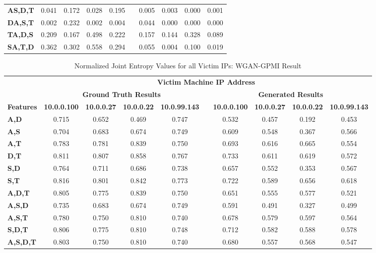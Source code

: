 \begin{table}[!htbp]
\begin{adjustbox}{angle=90}
\begin{tabular}{l|c|c|c|c|c|c|c|c|c|}
			\multicolumn{1}{l|}{\textbf{A{\given}S,D,T}} & 0.041 & 0.172 & 0.028 & 0.195 &  & 0.005	& 0.003	& 0.000	& 0.001 \\
			\multicolumn{1}{l|}{\textbf{D{\given}A,S,T}} & 0.002 & 0.232 & 0.002 & 0.004 &  & 0.044	& 0.000	& 0.000	& 0.000 \\
			\multicolumn{1}{l|}{\textbf{T{\given}A,D,S}} & 0.209 & 0.167 & 0.498 & 0.222 &  & 0.157	& 0.144	& 0.328	& 0.089 \\
			\multicolumn{1}{l|}{\textbf{S{\given}A,T,D}} & 0.362 & 0.302 & 0.558 & 0.294 &  & 0.055	& 0.004	& 0.100	& 0.019
		\end{tabular}
	\end{adjustbox}
\end{table}

\begin{table}[!htbp]
	\caption{Normalized Joint Entropy Values for all Victim IPs: WGAN-GPMI Result}
	\label{tab:je2}
	\centering
	\begin{adjustbox}{angle=90}
		\begin{tabular}{l|c|c|c|c|c|c|c|c|c|}
			\multicolumn{1}{c|}{} & \multicolumn{9}{c|}{\textbf{Victim Machine IP Address}} \\
			\multicolumn{1}{c|}{} & \multicolumn{4}{c|}{\textbf{Ground Truth Results}} &  & \multicolumn{4}{c|}{\textbf{Generated Results}} \\
			\multicolumn{1}{c|}{\textbf{Features}} & \textbf{10.0.0.100} & \textbf{10.0.0.27} & \textbf{10.0.0.22} & \textbf{10.0.99.143} &  & \textbf{10.0.0.100} & \textbf{10.0.0.27} & \textbf{10.0.0.22} & \textbf{10.0.99.143} \\ \hline
			\textbf{A,D} & 0.715 & 0.652 & 0.469 & 0.747 &  & 0.532 & 0.457 & 0.192 & 0.453 \\
			\textbf{A,S} & 0.704 & 0.683 & 0.674 & 0.749 &  & 0.609 & 0.548 & 0.367 & 0.566 \\
			\textbf{A,T} & 0.783 & 0.781 & 0.839 & 0.750 &  & 0.693 & 0.616 & 0.665 & 0.554 \\
			\textbf{D,T} & 0.811 & 0.807 & 0.858 & 0.767 &  & 0.733 & 0.611 & 0.619 & 0.572 \\
			\textbf{S,D} & 0.764 & 0.711 & 0.686 & 0.738 &  & 0.657 & 0.552 & 0.353 & 0.567 \\
			\textbf{S,T} & 0.816 & 0.801 & 0.842 & 0.773 &  & 0.722 & 0.589 & 0.656 & 0.618 \\ \hline
			\textbf{A,D,T} & 0.805 & 0.775 & 0.839 & 0.750 &  & 0.651 & 0.555 & 0.577 & 0.521 \\
			\textbf{A,S,D} & 0.735 & 0.683 & 0.674 & 0.749 &  & 0.591 & 0.491 & 0.327 & 0.499 \\
			\textbf{A,S,T} & 0.780 & 0.750 & 0.810 & 0.740 &  & 0.678 & 0.579 & 0.597 & 0.564 \\
			\textbf{S,D,T} & 0.806 & 0.775 & 0.810 & 0.748 &  & 0.712 & 0.582 & 0.588 & 0.578 \\ \hline
			\textbf{A,S,D,T} & 0.803 & 0.750 & 0.810 & 0.740 &  & 0.680 & 0.557 & 0.568 & 0.547
		\end{tabular}
	\end{adjustbox}
\end{table}

